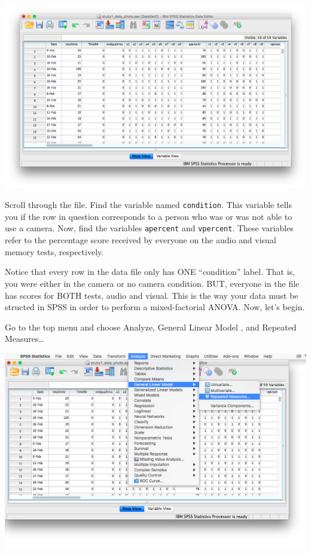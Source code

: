 \documentclass[
]{book}
\begin{document}
\includegraphics{img/11.4.11.png}

Scroll through the file. Find the variable named \texttt{condition}. This variable tells you if the row in question corresponds to a person who was or was not able to use a camera. Now, find the variables \texttt{apercent} and \texttt{vpercent}. These variables refer to the percentage score received by everyone on the audio and visual memory tests, respectively.

Notice that every row in the data file only has ONE ``condition'' label. That is, you were either in the camera or no camera condition. BUT, everyone in the file has scores for BOTH tests, audio and visual. This is the way your data must be structed in SPSS in order to perform a mixed-factorial ANOVA. Now, let's begin.

Go to the top menu and choose {Analyze}, {General Linear Model }, and {Repeated Measures\ldots{}}

\includegraphics{img/11.4.12.png}
\end{document}
